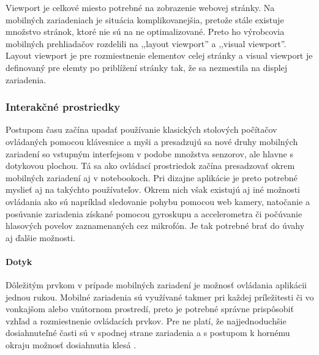 Viewport je celkové miesto potrebné na zobrazenie webovej stránky. Na mobilných zariadeniach je situácia komplikovanejšia, pretože stále existuje množstvo stránok, ktoré nie sú na ne optimalizované. Preto ho výrobcovia mobilných prehliadačov rozdelili na ,,layout viewport'' a ,,visual viewport''. \cite{pixelnotpixel} Layout viewport je pre rozmiestnenie elementov celej stránky a visual viewport je definovaný pre elemty po priblížení stránky tak, že sa nezmestila na displej zariadenia.


\subsubsection{Interakčné prostriedky} %
\label{ssub:interak_n_prostriedky}

Postupom času začína upadať používanie klasických stolových počítačov ovládaných pomocou klávesnice a myši a presadzujú sa nové druhy mobilných zariadení so vstupným interfejsom v podobe množstva senzorov, ale hlavne s dotykovou plochou. Tá sa ako ovládací prostriedok začína presadzovať okrem mobilných zariadení aj v notebookoch. Pri dizajne aplikácie je preto potrebné myslieť aj na takýchto používateľov. Okrem nich však existujú aj iné možnosti ovládania ako sú napríklad sledovanie pohybu pomocou web kamery, natočanie a posúvanie zariadenia získané pomocou gyroskupu a accelerometra či počúvanie hlasových povelov zaznamenaných cez mikrofón. Je tak potrebné brať do úvahy aj ďalšie možnosti.


\paragraph{Dotyk} %

Dôležitým prvkom v prípade mobilných zariadení je možnosť ovládania aplikácii jednou rukou. Mobilné zariadenia sú využívané takmer pri každej príležitesti či vo vonkajšom alebo vnútornom prostredí, preto je potrebné správne prispôsobiť vzhľad a rozmiestnenie ovládacích prvkov. Pre ne platí, že najjednoduchšie dosiahnuteľné časti sú v spodnej strane zariadenia a s postupom k hornému okraju možnosť dosiahnutia klesá \cite{mobilebooktouch}.

